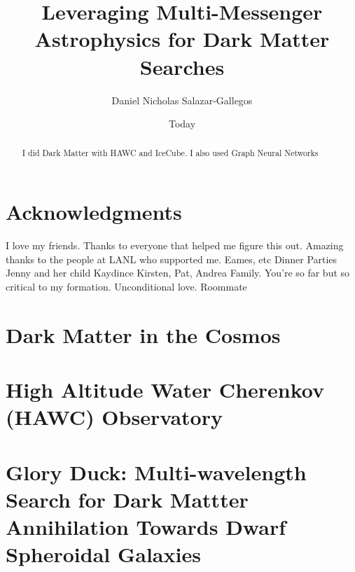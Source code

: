 \documentclass[PhD]{msu-thesis}
\title{Leveraging Multi-Messenger Astrophysics for Dark Matter Searches}
\author{Daniel Nicholas Salazar-Gallegos}
\date{Today}
\begin{document}
\frontmatter
\maketitlepage

\begin{abstract}
    I did Dark Matter with HAWC and IceCube. I also used Graph Neural Networks
\end{abstract}

\clearpage

\chapter*{Acknowledgments}
\DoubleSpacing
I love my friends.
Thanks to everyone that helped me figure this out.
Amazing thanks to the people at LANL who supported me.
Eames, etc
Dinner Parties
Jenny and her child Kaydince
Kirsten, Pat, Andrea
Family. You're so far but so critical to my formation. Unconditional love.
Roommate

\clearpage
\SingleSpacing
\tableofcontents*
\clearpage

\listoftables
\clearpage

\listoffigures
\mainmatter

\chapter{Dark Matter in the Cosmos\label{sec:dm_cosmos}}


\chapter{High Altitude Water Cherenkov (HAWC) Observatory\label{sec:hawc}}


\chapter{Glory Duck: Multi-wavelength Search for Dark Mattter Annihilation Towards Dwarf Spheroidal Galaxies}\label{sec:glory_duck}

\end{document}
